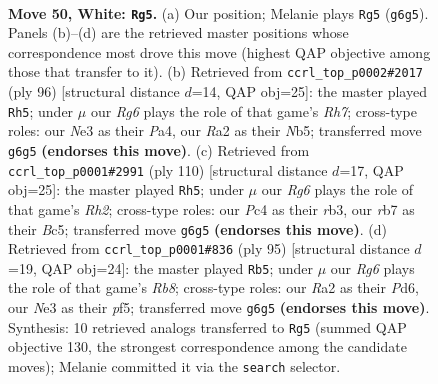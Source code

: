 \documentclass[11pt]{article}
\begin{document}
\clearpage

\begin{figure}[p]\centering
\begin{subfigure}{0.46\textwidth}\centering
\resizebox{\linewidth}{!}{%
\newchessgame
\chessboard[
  setfen={7k/1r4b1/6R1/8/2P5/4N2K/R7/8 w - - 20 50},
  showmover=false,
  pgfstyle=straightmove, color=movearrow, markmove={g6-g5}
]}
\caption{}
\end{subfigure}\hfill
\begin{subfigure}{0.46\textwidth}\centering
\resizebox{\linewidth}{!}{%
\newchessgame
\chessboard[
  setfen={5k2/1p4bR/8/1N6/P7/5r2/8/6K1 w - - 3 49},
  showmover=false,
  pgfstyle=straightmove, color=movearrow, markmove={h7-h5}
]}
\caption{}
\end{subfigure}
\\[4pt]
\begin{subfigure}{0.46\textwidth}\centering
\resizebox{\linewidth}{!}{%
\newchessgame
\chessboard[
  setfen={8/8/1P6/2B1K3/8/1r3k2/6bR/8 w - - 15 56},
  showmover=false,
  pgfstyle=straightmove, color=movearrow, markmove={h2-h5}
]}
\caption{}
\end{subfigure}\hfill
\begin{subfigure}{0.46\textwidth}\centering
\resizebox{\linewidth}{!}{%
\newchessgame
\chessboard[
  setfen={8/Rp4k1/3p4/5P2/8/8/3K4/1rB5 b - - 0 48},
  showmover=false,
  pgfstyle=straightmove, color=movearrow, markmove={b1-b5}
]}
\caption{}
\end{subfigure}
\caption{\textbf{Move 50, White: \texttt{Rg5}.} (a) Our position; Melanie plays \texttt{Rg5} (\texttt{g6g5}). Panels (b)--(d) are the retrieved master positions whose correspondence most drove this move (highest QAP objective among those that transfer to it). (b) Retrieved from \texttt{ccrl\_top\_p0002\#2017} (ply 96) [structural distance $d$=14, QAP obj=25]: the master played \texttt{Rh5}; under $\mu$ our \emph{Rg6} plays the role of that game's \emph{Rh7}; cross-type roles: our \emph{N}e3 as their \emph{P}a4, our \emph{R}a2 as their \emph{N}b5; transferred move \texttt{g6g5} \textbf{(endorses this move)}. (c) Retrieved from \texttt{ccrl\_top\_p0001\#2991} (ply 110) [structural distance $d$=17, QAP obj=25]: the master played \texttt{Rh5}; under $\mu$ our \emph{Rg6} plays the role of that game's \emph{Rh2}; cross-type roles: our \emph{P}c4 as their \emph{r}b3, our \emph{r}b7 as their \emph{B}c5; transferred move \texttt{g6g5} \textbf{(endorses this move)}. (d) Retrieved from \texttt{ccrl\_top\_p0001\#836} (ply 95) [structural distance $d$=19, QAP obj=24]: the master played \texttt{Rb5}; under $\mu$ our \emph{Rg6} plays the role of that game's \emph{Rb8}; cross-type roles: our \emph{R}a2 as their \emph{P}d6, our \emph{N}e3 as their \emph{p}f5; transferred move \texttt{g6g5} \textbf{(endorses this move)}. Synthesis: 10 retrieved analogs transferred to \texttt{Rg5} (summed QAP objective 130, the strongest correspondence among the candidate moves); Melanie committed it via the \texttt{search} selector.}
\label{fig:thought-m98}
\end{figure}
\end{document}
